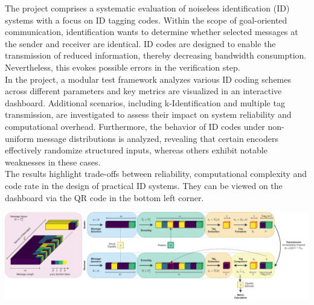 \documentclass[%
  english,%
  paper=A1,%
  fontsize=22pt,%
  cdfoot=5ex,%
  ddcfoot,%
  BCOR=-20mm,
]{tudscrposter}
\begin{document}
\maketitle
\setlength\parindent{0pt}
\begin{multicols}{3}
The project comprises a systematic evaluation of noiseless identification (ID) systems with a focus on ID tagging codes. Within the scope of goal-oriented communication, identification wants to determine whether  selected messages at the sender and receiver are identical. ID codes are designed to enable the transmission of reduced information, thereby decreasing bandwidth consumption. Nevertheless, this evokes possible errors in the verification step.\\
In the project, a modular test framework analyzes various ID coding schemes across different parameters and key metrics are visualized in an interactive dashboard.
Additional scenarios, including k-Identification and multiple tag transmission, are investigated to assess their impact on system reliability and computational overhead.
Furthermore, the behavior of ID codes under non-uniform message distributions is analyzed, revealing that certain encoders effectively randomize structured inputs, whereas others exhibit notable weaknesses in these cases.\\
The results highlight trade-offs between reliability, computational complexity and code rate in the design of practical ID systems. They can be viewed on the dashboard via the QR code in the bottom left corner.
\end{multicols}
\vspace{1cm}

\hspace{-2.3cm}\includegraphics[width = 1.1\textwidth]{figures/ID_flow-Main Graph.drawio.pdf}
\end{document}
